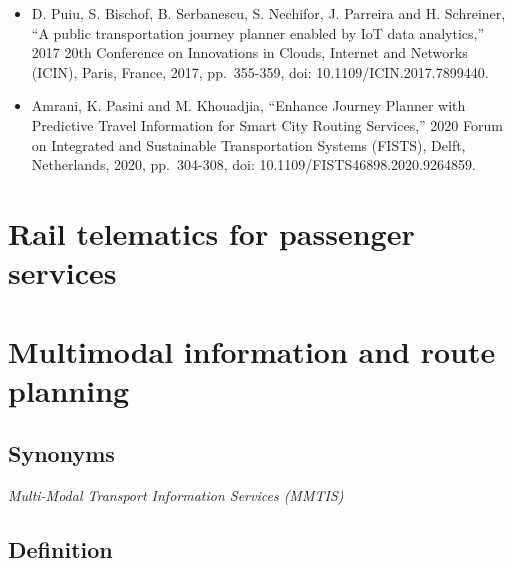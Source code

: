 \documentclass[
]{book}
\begin{document}
\begin{itemize}
\item
  D. Puiu, S. Bischof, B. Serbanescu, S. Nechifor, J. Parreira and H. Schreiner, ``A public transportation journey planner enabled by IoT data analytics,'' 2017 20th Conference on Innovations in Clouds, Internet and Networks (ICIN), Paris, France, 2017, pp.~355-359, doi: 10.1109/ICIN.2017.7899440.
\item
  Amrani, K. Pasini and M. Khouadjia, ``Enhance Journey Planner with Predictive Travel Information for Smart City Routing Services,'' 2020 Forum on Integrated and Sustainable Transportation Systems (FISTS), Delft, Netherlands, 2020, pp.~304-308, doi: 10.1109/FISTS46898.2020.9264859.
\end{itemize}

\hypertarget{telematics_passenger}{%
\section{Rail telematics for passenger services}\label{telematics_passenger}}

\hypertarget{info_and_route_planning}{%
\section{Multimodal information and route planning}\label{info_and_route_planning}}

\hypertarget{synonyms-12}{%
\subsection*{Synonyms}\label{synonyms-12}}

\emph{Multi-Modal Transport Information Services (MMTIS)}

\hypertarget{definition-13}{%
\subsection*{Definition}\label{definition-13}}
\end{document}
